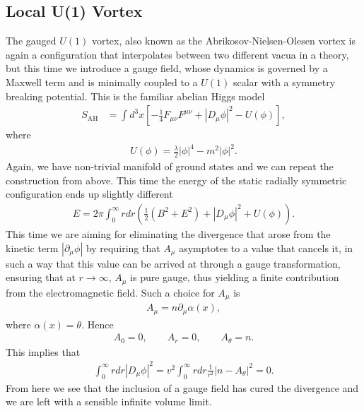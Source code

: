        \subsection{Local U(1) Vortex}
        The gauged $U(1)$ vortex, also known as the Abrikosov-Nielsen-Olesen vortex is again a configuration that interpolates between two different vacua in a theory, but this time we introduce a gauge field, whose dynamics is governed by a Maxwell term and is minimally coupled to a $U(1)$ scalar with a symmetry breaking potential. This is the familiar abelian Higgs model
        \begin{align}
            S_{\text{AH}} & = \int d^3x \left[-\frac{1}{4} F_{\mu \nu} F^{\mu \nu} + | D_{\mu} \phi|^2 - U(\phi) \right], \label{eq:Abelian_Higgs_Model}
        \end{align}
        where
        \begin{align}
            U(\phi) = \frac{\lambda}{2} |\phi|^4 - m^2 |\phi|^2.
        \end{align}
    Again, we have non-trivial manifold of ground states and we can repeat the construction from above. This time the energy of the static radially symmetric configuration ends up slightly different
    \begin{align}
        E = 2 \pi \int_0^{\infty} r dr \left(\frac{1}{2}( B^2 + E^2) + |D_{\mu} \phi|^2 + U(\phi) \right) .
    \end{align}
    This time we are aiming for eliminating the divergence that arose from the kinetic term $|\partial_{\mu}\phi|$ by requiring that $A_{\mu}$ asymptotes to a value that cancels it, in such a way that this value can be arrived at through a gauge transformation, ensuring that at $r\rightarrow \infty$, $A_{\mu}$ is pure gauge, thus yielding a finite contribution from the electromagnetic field. Such a choice for $A_{\mu}$ is
    \begin{align}
        A_{\mu} = n \partial_{\mu} \alpha(x),
    \end{align}
    where $\alpha(x) = \theta$. Hence
    \begin{align}
        A_0 =0, \qquad A_r =0, \qquad A_{\theta} = n.
    \end{align}
    This implies that
    \begin{align}
        \int_0^{\infty} r dr |D_{\mu}\phi|^2 = v^2\int_0^{\infty} r dr  \frac{1}{r^2}|n-A_{\theta}|^2 =0.
    \end{align}
    From here we see that the inclusion of a gauge field has cured the divergence and we are left with a sensible infinite volume limit. 

